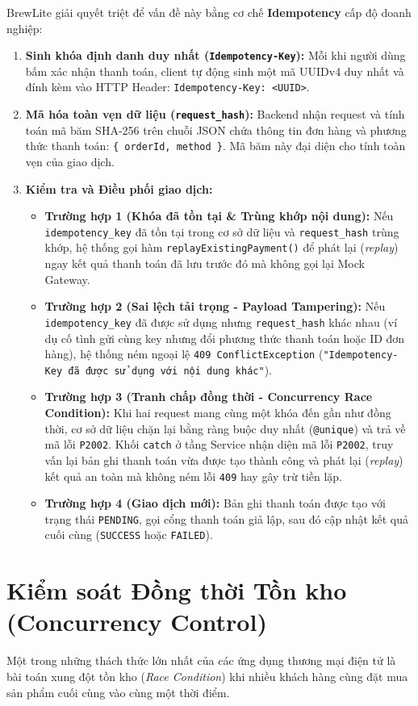 \documentclass[12pt,a4paper,oneside]{report}
\begin{document}
BrewLite giải quyết triệt để vấn đề này bằng cơ chế \textbf{Idempotency} cấp độ doanh nghiệp:
\begin{enumerate}
    \item \textbf{Sinh khóa định danh duy nhất (\texttt{Idempotency-Key}):} Mỗi khi người dùng bấm xác nhận thanh toán, client tự động sinh một mã UUIDv4 duy nhất và đính kèm vào HTTP Header: \texttt{Idempotency-Key: <UUID>}.
    \item \textbf{Mã hóa toàn vẹn dữ liệu (\texttt{request\_hash}):} Backend nhận request và tính toán mã băm SHA-256 trên chuỗi JSON chứa thông tin đơn hàng và phương thức thanh toán: \texttt{\{ orderId, method \}}. Mã băm này đại diện cho tính toàn vẹn của giao dịch.
    \item \textbf{Kiểm tra và Điều phối giao dịch:}
    \begin{itemize}
        \item \textbf{Trường hợp 1 (Khóa đã tồn tại \& Trùng khớp nội dung):} Nếu \texttt{idempotency\_key} đã tồn tại trong cơ sở dữ liệu và \texttt{request\_hash} trùng khớp, hệ thống gọi hàm \texttt{replayExistingPayment()} để phát lại (\textit{replay}) ngay kết quả thanh toán đã lưu trước đó mà không gọi lại Mock Gateway.
        \item \textbf{Trường hợp 2 (Sai lệch tải trọng - Payload Tampering):} Nếu \texttt{idempotency\_key} đã được sử dụng nhưng \texttt{request\_hash} khác nhau (ví dụ cố tình gửi cùng key nhưng đổi phương thức thanh toán hoặc ID đơn hàng), hệ thống ném ngoại lệ \texttt{409 ConflictException} (\texttt{"Idempotency-Key đã được sử dụng với nội dung khác"}).
        \item \textbf{Trường hợp 3 (Tranh chấp đồng thời - Concurrency Race Condition):} Khi hai request mang cùng một khóa đến gần như đồng thời, cơ sở dữ liệu chặn lại bằng ràng buộc duy nhất (\texttt{@unique}) và trả về mã lỗi \texttt{P2002}. Khối \texttt{catch} ở tầng Service nhận diện mã lỗi \texttt{P2002}, truy vấn lại bản ghi thanh toán vừa được tạo thành công và phát lại (\textit{replay}) kết quả an toàn mà không ném lỗi \texttt{409} hay gây trừ tiền lặp.
        \item \textbf{Trường hợp 4 (Giao dịch mới):} Bản ghi thanh toán được tạo với trạng thái \texttt{PENDING}, gọi cổng thanh toán giả lập, sau đó cập nhật kết quả cuối cùng (\texttt{SUCCESS} hoặc \texttt{FAILED}).
    \end{itemize}
\end{enumerate}

\section{Kiểm soát Đồng thời Tồn kho (Concurrency Control)}
Một trong những thách thức lớn nhất của các ứng dụng thương mại điện tử là bài toán xung đột tồn kho (\textit{Race Condition}) khi nhiều khách hàng cùng đặt mua sản phẩm cuối cùng vào cùng một thời điểm.
\end{document}
